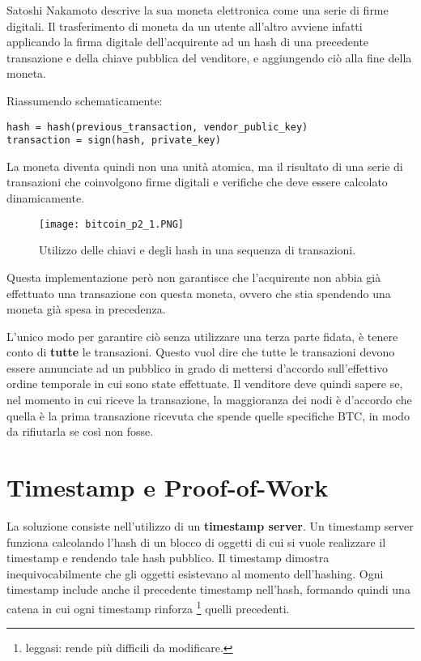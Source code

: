Satoshi Nakamoto descrive la sua moneta elettronica come una serie di firme digitali. Il trasferimento di moneta da un utente all'altro avviene infatti applicando la firma digitale dell'acquirente ad un hash di una precedente transazione e della chiave pubblica del venditore, e aggiungendo ciò alla fine della moneta.

Riassumendo schematicamente:

\begin{verbatim}
hash = hash(previous_transaction, vendor_public_key)
transaction = sign(hash, private_key)
\end{verbatim}

La moneta diventa quindi non una unità atomica, ma il risultato di una serie di transazioni che coinvolgono firme digitali e verifiche che deve essere calcolato dinamicamente. 

\begin{figure}[htbp]
\centering
\texttt{[image: bitcoin\_p2\_1.PNG]}
\caption[Sequenza di transazioni]{Utilizzo delle chiavi e degli hash in una sequenza di transazioni.\label{bitcoin_p2_1}}
\end{figure}

Questa implementazione però non garantisce che l'acquirente non abbia già effettuato una transazione con questa moneta, ovvero che stia spendendo una moneta già spesa in precedenza.

L'unico modo per garantire ciò senza utilizzare una terza parte fidata, è tenere conto di \textbf{tutte} le transazioni. Questo vuol dire che tutte le transazioni devono essere annunciate ad un pubblico in grado di mettersi d'accordo sull'effettivo ordine temporale in cui sono state effettuate. Il venditore deve quindi sapere se, nel momento in cui riceve la transazione, la maggioranza dei nodi è d'accordo che quella è la prima transazione ricevuta che spende quelle specifiche BTC, in modo da rifiutarla se così non fosse.

\section{Timestamp e Proof-of-Work}\label{timestamp-e-proof-of-work}

La soluzione consiste nell'utilizzo di un \textbf{timestamp server}. Un timestamp server funziona calcolando l'hash di un blocco di oggetti di cui si vuole realizzare il timestamp e rendendo tale hash pubblico. Il timestamp dimostra inequivocabilmente che gli oggetti esistevano al momento dell'hashing. Ogni timestamp include anche il precedente timestamp nell'hash, formando quindi una catena in cui ogni timestamp rinforza \footnote{leggasi: rende più difficili da modificare.} quelli precedenti.

